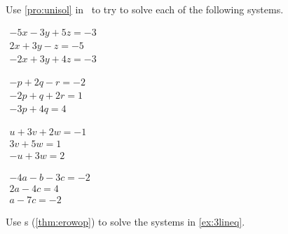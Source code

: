 \begin{exercise} \label{ex:3lineq} 
Use \cref{pro:unisol} in \script\ to try to solve each of the following systems.
\begin{Parts}
\item \(\begin{array}{l}
-5x  -3y   +5z=  -3 \\
   2x   +3y  -z = -5\\
  -2x   +3y   +4z=  -3
\end{array}\)

\item \(\begin{array}{l}
-p   +2q  -r=  -2\\
  -2p   +q   +2r=   1\\
  -3p   +4q=   4\end{array}\)

\item \(\begin{array}{l}
u   +3v   +2w=  -1\\
      3v   +5w=   1\\
  -u      +3w=   2\end{array}\)

\begin{OmitV1}
\item \(\begin{array}{l}
-4a  -b  -3c=  -2\\
   2a    -4c=   4\\
   a     -7c=  -2\end{array}\)
\end{OmitV1}

%
\end{Parts}
\end{exercise}


\begin{exercise}  
Use s (\cref{thm:erowop}) to solve the systems in \cref{ex:3lineq}.
\end{exercise}






